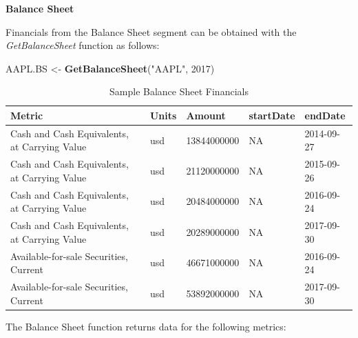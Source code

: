 \documentclass[]{book}
\newenvironment{Shaded}{\begin{snugshade}}{\end{snugshade}}
\newcommand{\KeywordTok}[1]{\textcolor[rgb]{0.13,0.29,0.53}{\textbf{#1}}}
\newcommand{\DecValTok}[1]{\textcolor[rgb]{0.00,0.00,0.81}{#1}}
\newcommand{\StringTok}[1]{\textcolor[rgb]{0.31,0.60,0.02}{#1}}
\newcommand{\NormalTok}[1]{#1}
\theoremstyle{definition}
\theoremstyle{definition}
\theoremstyle{definition}
\theoremstyle{remark}
\begin{document}
\textbf{Balance Sheet}

Financials from the Balance Sheet segment can be obtained with the
\emph{GetBalanceSheet} function as follows:

\begin{Shaded}
\begin{Highlighting}[]
\NormalTok{AAPL.BS <-}\StringTok{ }\KeywordTok{GetBalanceSheet}\NormalTok{(}\StringTok{"AAPL"}\NormalTok{, }\DecValTok{2017}\NormalTok{)}
\end{Highlighting}
\end{Shaded}

\begin{table}[t]

\caption{\label{tab:unnamed-chunk-32}Sample Balance Sheet Financials}
\centering
\begin{tabular}{lllll}
\toprule
Metric & Units & Amount & startDate & endDate\\
\midrule
Cash and Cash Equivalents, at Carrying Value & usd & 13844000000 & NA & 2014-09-27\\
Cash and Cash Equivalents, at Carrying Value & usd & 21120000000 & NA & 2015-09-26\\
Cash and Cash Equivalents, at Carrying Value & usd & 20484000000 & NA & 2016-09-24\\
Cash and Cash Equivalents, at Carrying Value & usd & 20289000000 & NA & 2017-09-30\\
Available-for-sale Securities, Current & usd & 46671000000 & NA & 2016-09-24\\
\addlinespace
Available-for-sale Securities, Current & usd & 53892000000 & NA & 2017-09-30\\
\bottomrule
\end{tabular}
\end{table}

The Balance Sheet function returns data for the following metrics:
\end{document}
